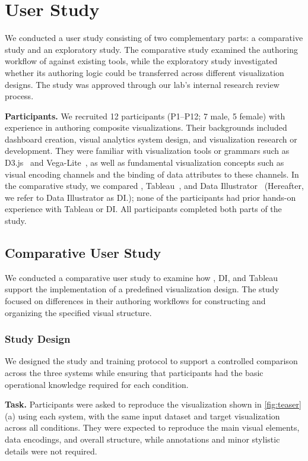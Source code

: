 \section{User Study}

We conducted a user study consisting of two complementary parts: a comparative
study and an exploratory study. The comparative study examined the authoring
workflow of {\system} against existing tools, while the exploratory study
investigated whether its authoring logic could be transferred across different
visualization designs. 
The study was approved through our lab's internal research review process.

\textbf{Participants.}
We recruited 12 participants (P1--P12; 7 male, 5 female) with experience in
authoring composite visualizations. Their backgrounds included dashboard
creation, visual analytics system design, and visualization research or
development. They were familiar with visualization tools or grammars such as
D3.js~\cite{D3} and Vega-Lite~\cite{VegaLite}, as well as
fundamental visualization concepts such as visual encoding channels and the
binding of data attributes to these channels. In the comparative study, we
compared {\system}, Tableau~\cite{Tableau}, and Data Illustrator~\cite{DataIllustrator}
(Hereafter, we refer to Data Illustrator as DI.); none of the participants had prior hands-on
experience with Tableau or DI. All participants completed both parts of the
study.

\subsection{Comparative User Study}
\label{sec:comparative-study}

We conducted a comparative user study to examine how {\system}, DI, and
Tableau support the implementation of a predefined visualization design. The
study focused on differences in their authoring workflows for constructing and
organizing the specified visual structure.

\subsubsection{Study Design}

We designed the study and training protocol to support a controlled comparison
across the three systems while ensuring that participants had the basic
operational knowledge required for each condition.

\textbf{Task.}
Participants were asked to reproduce the visualization shown in
\autoref{fig:teaser}(a) using each system, with the same input dataset and
target visualization across all conditions. They were expected to reproduce
the main visual elements, data encodings, and overall structure, while
annotations and minor stylistic details were not required.

